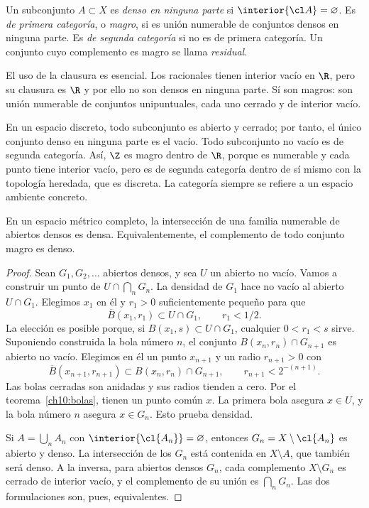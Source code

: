 \begin{definicion}
Un subconjunto $A\subset X$ es \emph{denso en ninguna parte} si $\interior{\cl A}=\varnothing$. Es \emph{de primera categoría}, o \emph{magro}, si es unión numerable de conjuntos densos en ninguna parte. Es \emph{de segunda categoría} si no es de primera categoría. Un conjunto cuyo complemento es magro se llama \emph{residual}.
\end{definicion}
El uso de la clausura es esencial. Los racionales tienen interior vacío en $\R$, pero su clausura es $\R$ y por ello no son densos en ninguna parte. Sí son magros: son unión numerable de conjuntos unipuntuales, cada uno cerrado y de interior vacío.

\begin{ejemplo}
En un espacio discreto, todo subconjunto es abierto y cerrado; por tanto, el único conjunto denso en ninguna parte es el vacío. Todo subconjunto no vacío es de segunda categoría. Así, $\Z$ es magro dentro de $\R$, porque es numerable y cada punto tiene interior vacío, pero es de segunda categoría dentro de sí mismo con la topología heredada, que es discreta. La categoría siempre se refiere a un espacio ambiente concreto.
\end{ejemplo}

\begin{teorema}\label{ch10:baire}
En un espacio métrico completo, la intersección de una familia numerable de abiertos densos es densa. Equivalentemente, el complemento de todo conjunto magro es denso.
\end{teorema}
\begin{proof}
Sean $G_1,G_2,\ldots$ abiertos densos, y sea $U$ un abierto no vacío. Vamos a construir un punto de $U\cap\bigcap_nG_n$. La densidad de $G_1$ hace no vacío al abierto $U\cap G_1$. Elegimos $x_1$ en él y $r_1>0$ suficientemente pequeño para que
\[
 \overline B(x_1,r_1)\subset U\cap G_1,\qquad r_1<1/2.
\]
La elección es posible porque, si $B(x_1,s)\subset U\cap G_1$, cualquier $0<r_1<s$ sirve. Suponiendo construida la bola número $n$, el conjunto $B(x_n,r_n)\cap G_{n+1}$ es abierto no vacío. Elegimos en él un punto $x_{n+1}$ y un radio $r_{n+1}>0$ con
\[
 \overline B(x_{n+1},r_{n+1})\subset B(x_n,r_n)\cap G_{n+1},
 \qquad r_{n+1}<2^{-(n+1)}.
\]
Las bolas cerradas son anidadas y sus radios tienden a cero. Por el teorema~\ref{ch10:bolas}, tienen un punto común $x$. La primera bola asegura $x\in U$, y la bola número $n$ asegura $x\in G_n$. Esto prueba densidad.

Si $A=\bigcup_nA_n$ con $\interior{\cl{A_n}}=\varnothing$, entonces $G_n=X\setminus\cl{A_n}$ es abierto y denso. La intersección de los $G_n$ está contenida en $X\setminus A$, que también será denso. A la inversa, para abiertos densos $G_n$, cada complemento $X\setminus G_n$ es cerrado de interior vacío, y el complemento de su unión es $\bigcap_nG_n$. Las dos formulaciones son, pues, equivalentes.
\end{proof}

